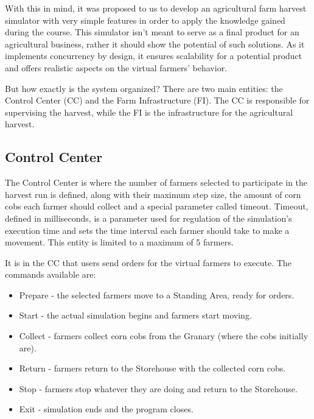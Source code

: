 \documentclass[12pt]{article}
\begin{document}
With this in mind, it was proposed to us to develop an agricultural farm harvest simulator with very simple features in order to apply the knowledge gained 
during the course.
This simulator isn't meant to serve as a final product for an agricultural business, rather it should show the potential of such solutions.
As it implements concurrency by design, it ensures scalability for a potential product and offers realistic aspects on the virtual farmers' behavior.

But how exactly is the system organized?
There are two main entities: the Control Center (CC) and the Farm Infrastructure (FI). 
The CC is responsible for supervising the harvest, while the FI is the infrastructure for the agricultural harvest.

\subsection{Control Center} %

The Control Center is where the number of farmers selected to participate in the harvest run is defined, along with their maximum step size, the amount of corn 
cobs each farmer should collect and a special parameter called timeout.
Timeout, defined in milliseconds, is a parameter used for regulation of the simulation's execution time and sets the time interval each farmer should take to 
make a movement.
This entity is limited to a maximum of 5 farmers.

It is in the CC that users send orders for the virtual farmers to execute.
The commands available are:
\vspace{-10pt}
\begin{itemize}[noitemsep]
  \item Prepare - the selected farmers move to a Standing Area, ready for orders.
  \item Start - the actual simulation begins and farmers start moving.
  \item Collect - farmers collect corn cobs from the Granary (where the cobs initially are).
  \item Return - farmers return to the Storehouse with the collected corn cobs.
  \item Stop - farmers stop whatever they are doing and return to the Storehouse.
  \item Exit - simulation ends and the program closes.
\end{itemize}
\vspace{-10pt}
\end{document}
